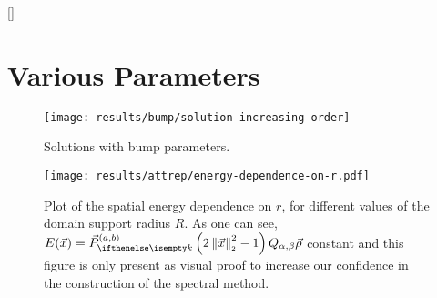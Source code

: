 \appendix
{}[\vspace{4.5cm}]
\titlespacing{\chapter}{0cm}{0cm}{0cm}

\chapter{Various Parameters}
\label{chap:appendix}

\begin{figure}[H]
  \centering
  \label{fig:bump-solutions}
  \texttt{[image: results/bump/solution-increasing-order]}
  \caption[Bump parameter solutions]{Solutions with bump parameters.}
\end{figure}

\begin{figure}[H]
  \centering
  \label{fig:spatial-energy-dependence}
  \texttt{[image: results/attrep/energy-dependence-on-r.pdf]}
  \caption[Spatial energy dependence on $r$]{Plot of the spatial energy dependence on $r$, for different values of the domain support radius $R$. As one can see, $E(\vec{x}) = \jacobivec{x} Q_{\alpha,\beta} \vec{\rho}$ constant and this figure is only present as visual proof to increase our confidence in the construction of the spectral method.}
\end{figure}

